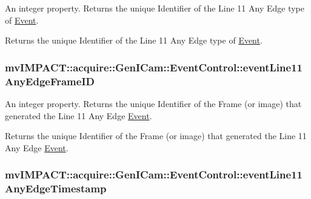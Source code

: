 An integer property. Returns the unique Identifier of the Line 11 Any Edge type of \hyperlink{classmv_i_m_p_a_c_t_1_1acquire_1_1_event}{Event}. 

Returns the unique Identifier of the Line 11 Any Edge type of \hyperlink{classmv_i_m_p_a_c_t_1_1acquire_1_1_event}{Event}. \hypertarget{classmv_i_m_p_a_c_t_1_1acquire_1_1_gen_i_cam_1_1_event_control_a9fc24a1d2d00429985a5513c88ad0441}{
\subsubsection[{event\+Line11\+Any\+Edge\+Frame\+I\+D}]{ mv\+I\+M\+P\+A\+C\+T\+::acquire\+::\+Gen\+I\+Cam\+::\+Event\+Control\+::event\+Line11\+Any\+Edge\+Frame\+I\+D}}\label{classmv_i_m_p_a_c_t_1_1acquire_1_1_gen_i_cam_1_1_event_control_a9fc24a1d2d00429985a5513c88ad0441}


An integer property. Returns the unique Identifier of the Frame (or image) that generated the Line 11 Any Edge \hyperlink{classmv_i_m_p_a_c_t_1_1acquire_1_1_event}{Event}. 

Returns the unique Identifier of the Frame (or image) that generated the Line 11 Any Edge \hyperlink{classmv_i_m_p_a_c_t_1_1acquire_1_1_event}{Event}. \hypertarget{classmv_i_m_p_a_c_t_1_1acquire_1_1_gen_i_cam_1_1_event_control_a00e0833d3931d1fe1dac9dacf77a22b1}{
\subsubsection[{event\+Line11\+Any\+Edge\+Timestamp}]{ mv\+I\+M\+P\+A\+C\+T\+::acquire\+::\+Gen\+I\+Cam\+::\+Event\+Control\+::event\+Line11\+Any\+Edge\+Timestamp}}\label{classmv_i_m_p_a_c_t_1_1acquire_1_1_gen_i_cam_1_1_event_control_a00e0833d3931d1fe1dac9dacf77a22b1}



